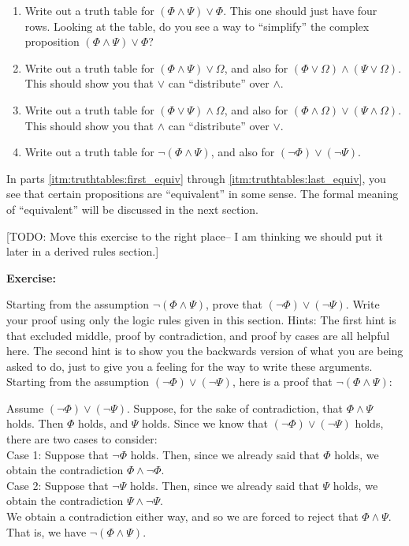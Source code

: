 \documentclass[12pt]{article}
\newcommand{\note}[1]{[#1]}
\newcommand{\AND}{\wedge}
\newcommand{\OR}{\vee}
\newcommand{\ex}[1]{\textbf{Exercise:}\begin{adjustwidth}{2em}{}#1\end{adjustwidth}}
\newcommand{\indented}[1]{\begin{adjustwidth}{1em}{}#1\end{adjustwidth}}
\def\pA{\Phi}
\def\pB{\Psi}
\def\pC{\Omega}
\begin{document}
{\begin{enumerate}
\item
Write out a truth table for $(\pA\AND\pB)\OR\pA$. This one should just have four rows.
Looking at the table, do you see a way to ``simplify'' the complex proposition  $(\pA\AND\pB)\OR\pA$?

\item
Write out a truth table for $(\pA\AND\pB)\OR\pC$, and also for $(\pA\OR\pC)\AND(\pB\OR\pC)$.
This should show you that $\OR$ can ``distribute'' over $\AND$.

\item
Write out a truth table for $(\pA\OR\pB)\AND\pC$, and also for $(\pA\AND\pC)\OR(\pB\AND\pC)$.
This should show you that $\AND$ can ``distribute'' over $\OR$.

\item \label{itm:truthtables:last_equiv}
Write out a truth table for $\neg(\pA\AND\pB)$, and also for $(\neg\pA)\OR(\neg\pB)$.
\end{enumerate}
In parts \ref{itm:truthtables:first_equiv} through \ref{itm:truthtables:last_equiv},
you see that certain propositions are ``equivalent'' in some sense. The formal meaning of ``equivalent'' will be
discussed in the next section.
}


\newpage

\note{TODO: Move this exercise to the right place-- I am thinking we should put it later in a derived rules section.}

\ex{
Starting from the assumption $\neg(\pA\AND\pB)$, prove that $(\neg\pA)\OR(\neg\pB)$.
Write your proof using only the logic rules given in this section.
Hints:
The first hint is that excluded middle, proof by contradiction, and proof by cases are all helpful here.
The second hint is to show you the backwards version of what you are being asked to do, just to give you a feeling for the way to write these arguments.
Starting from the assumption $(\neg\pA)\OR(\neg\pB)$, here is a proof that $\neg(\pA\AND\pB)$:
\indented{
Assume $(\neg\pA)\OR(\neg\pB)$.
Suppose, for the sake of contradiction, that $\pA\AND\pB$ holds.
Then $\pA$ holds, and $\pB$ holds. Since we know that $(\neg\pA)\OR(\neg\pB)$ holds, there are two cases to consider:\\[0.5em]
Case 1: Suppose that $\neg\pA$ holds. Then, since we already said that $\pA$ holds, we obtain the contradiction $\pA\AND\neg\pA$.\\[0.5em]
Case 2: Suppose that $\neg\pB$ holds. Then, since we already said that $\pB$ holds, we obtain the contradiction $\pB\AND\neg\pB$.\\[0.5em]
We obtain a contradiction either way, and so we are forced to reject that $\pA\AND\pB$. That is, we have $\neg(\pA\AND\pB)$.
}
}
\end{document}
